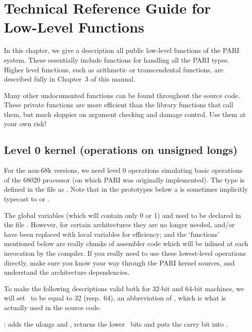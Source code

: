 \chapter{Technical Reference Guide for Low-Level Functions}
\def\B{\kbd{BIL}}
\def\op{{\it op\/}}
\def\fun#1#2#3{\noindent{\tt #1 \key{#2}(#3)}:}

In this chapter, we give a description all public low-level functions of the
PARI system. These essentially include functions for handling all the PARI
types. Higher level functions, such as arithmetic or transcendental
functions, are described fully in Chapter~3 of this manual.

Many other undocumented functions can be found throughout the source code.
These private functions are more efficient than the library functions that
call them, but much sloppier on argument checking and damage control. Use
them at your own risk!

\section{Level 0 kernel (operations on unsigned longs)}

\noindent
For the non-68k versions, we need level 0 operations simulating basic
operations of the 68020 processor (on which PARI was originally
implemented). The type  is defined in the file  as
. Note that in the prototypes below a  is
sometimes implicitly typecast to  or .

The global  variables  (which will contain
only 0 or 1) and  used to be declared in the file
. However, for certain architectures they are no longer
needed, and/or have been replaced with local variables for efficiency;
and the `functions' mentioned below are really chunks of assembler code which
will be inlined at each invocation by the compiler. If you really need to
use these lowest-level operations directly, make sure you know your way
through the PARI kernel sources, and understand the architecture dependencies.

To make the following descriptions valid both for 32-bit and 64-bit
machines, we will set \B\ to be equal to 32 (resp.~64), an abbreviation of
, which is what is actually used in the source code.

\fun{int}{addll}{int x, int y} adds the ulongs  and ,
returns the lower \B\ bits and puts the carry bit into .

